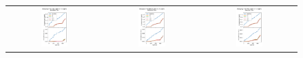 \documentclass[preprintm,linenumbers]{aastex631}
\begin{document}
		
		\begin{figure}
			\centering
			\begin{tabular}{c c c}
				\includegraphics[width=0.3\textwidth]{results/DiscoveryTime_MBA_first_year_one_snap_v4_0_10yrs_db_n_visits_4_noDD_noTwi.pdf} &
				\includegraphics[width=0.3\textwidth]{results/DiscoveryTime_NEO_first_year_one_snap_v4_0_10yrs_db_n_visits_4_noDD_noTwi.pdf} &
				\includegraphics[width=0.3\textwidth]{results/DiscoveryTime_PHA_first_year_one_snap_v4_0_10yrs_db_n_visits_4_noDD_noTwi.pdf} \\

\end{tabular}
\end{figure}
\end{document}
